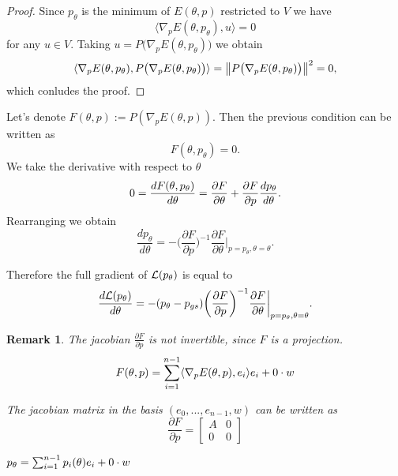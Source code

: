 \documentclass[a4paper,10pt]{report}
\newtheorem{remark}{Remark}
\begin{document}
\begin{proof}
  Since $p_\theta$ is the minimum of $E(\theta,p)$ restricted to $V$ we have \[\langle \nabla_p E(\theta,p_{\theta}), u \rangle = 0\] for any $u\in V$. Taking $u = P\big( \nabla_p E(\theta,p_\theta)\big)$ we obtain
  \[\langle \nabla_p E(\theta,p_{\theta}), P\big( \nabla_p E(\theta,p_\theta)\big) \rangle = \left\|P\big( \nabla_p E(\theta,p_\theta)\big)\right\|^2=0,\]
  which conludes the proof.
\end{proof}

Let's denote $F(\theta,p) :=P (\nabla_p E(\theta,p)).$ Then the previous condition can be written as
\begin{equation}
 F(\theta,p_\theta) = 0.
\end{equation}
We take the derivative with respect to $\theta$
\begin{equation}
0=\frac{dF(\theta, p_\theta)}{d \theta} = \frac{\partial F}{\partial \theta} + \frac{\partial F}{\partial p} \frac{dp_\theta}{d \theta}.
\end{equation}
Rearranging we obtain
\begin{equation}
 \frac{d p_\theta}{d\theta} = - \bigg(\frac{\partial F}{\partial p}\bigg)^{-1}  \frac{\partial F}{\partial \theta}\bigg|_{p=p_\theta, \theta=\theta}.
\end{equation}

Therefore the full gradient of $\mathcal{L}(p_\theta)$ is equal to
\begin{equation}
 \frac{d\mathcal{L}(p_\theta)}{d \theta} = - (p_\theta - p_{gs})\bigg(\frac{\partial F}{\partial p}\bigg)^{-1}  \frac{\partial F}{\partial \theta}\bigg|_{p=p_\theta, \theta=\theta}.
\end{equation}
\begin{remark}
 The jacobian $\frac{\partial F}{\partial p}$ is not invertible, since $F$ is a projection.
 \begin{equation}
  F(\theta, p) = \sum_{i=1}^{n-1} \langle \nabla_p E(\theta, p), e_i \rangle e_i +  0 \cdot w
 \end{equation}

 The jacobian matrix in the basis $(e_0,...,e_{n-1},w)$ can be written as \begin{equation}
                      \frac{\partial F}{\partial p} =\begin{bmatrix}
A & 0 \\
0 & 0
\end{bmatrix}
                     \end{equation}

 $p_\theta = \sum_{i=1}^{n-1}p_i(\theta) e_i +  0 \cdot w$
\end{remark}
\end{document}
